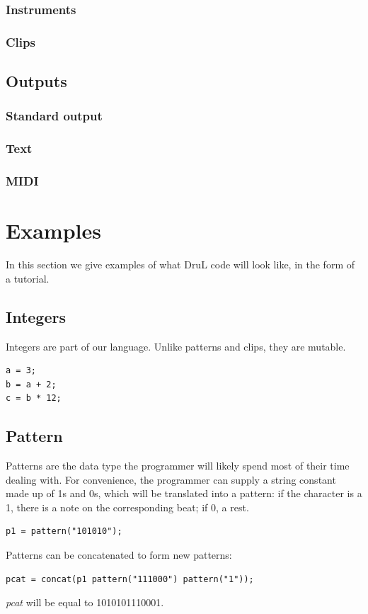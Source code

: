 \documentclass[11pt,twoside]{article}
\begin{document}
\subsubsection{Instruments}


\subsubsection{Clips}

\subsection{Outputs}

\subsubsection{Standard output}

\subsubsection{Text}

\subsubsection{MIDI}

\section{Examples}
In this section we give examples of what DruL code will look like, in the form
of a tutorial.

\subsection{Integers}
Integers are part of our language. Unlike patterns and clips, they are mutable.
\begin{verbatim}
a = 3;
b = a + 2;
c = b * 12;
\end{verbatim}

\subsection{Pattern}
Patterns are the data type the programmer will likely spend most of their time dealing with.  For convenience, the programmer can supply a string constant made up of 1s and 0s, which will be translated into a pattern: if the character is a 1, there is a note on the corresponding beat; if 0, a rest.
\begin{verbatim}
p1 = pattern("101010");
\end{verbatim}
Patterns can be concatenated to form new patterns:
\begin{verbatim}
pcat = concat(p1 pattern("111000") pattern("1"));
\end{verbatim}
\textit{pcat} will be equal to 1010101110001.
\end{document}

